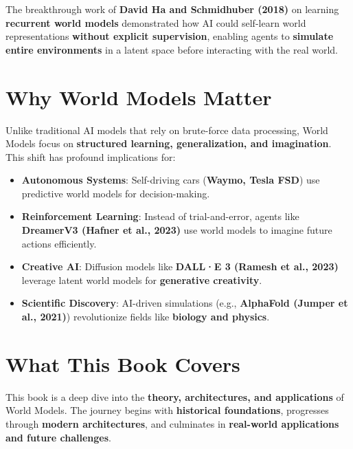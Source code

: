\documentclass[
]{book}
\providecommand{\tightlist}{%
  \setlength{\itemsep}{0pt}\setlength{\parskip}{0pt}}
\begin{document}
The breakthrough work of \textbf{David Ha and Schmidhuber (2018)} on learning \textbf{recurrent world models} demonstrated how AI could self-learn world representations \textbf{without explicit supervision}, enabling agents to \textbf{simulate entire environments} in a latent space before interacting with the real world.

\section{Why World Models Matter}\label{why-world-models-matter}

Unlike traditional AI models that rely on brute-force data processing, World Models focus on \textbf{structured learning, generalization, and imagination}. This shift has profound implications for:

\begin{itemize}
\tightlist
\item
  \textbf{Autonomous Systems}: Self-driving cars (\textbf{Waymo, Tesla FSD}) use predictive world models for decision-making.\\
\item
  \textbf{Reinforcement Learning}: Instead of trial-and-error, agents like \textbf{DreamerV3 (Hafner et al., 2023)} use world models to imagine future actions efficiently.\\
\item
  \textbf{Creative AI}: Diffusion models like \textbf{DALL·E 3 (Ramesh et al., 2023)} leverage latent world models for \textbf{generative creativity}.\\
\item
  \textbf{Scientific Discovery}: AI-driven simulations (e.g., \textbf{AlphaFold (Jumper et al., 2021)}) revolutionize fields like \textbf{biology and physics}.
\end{itemize}

\section{What This Book Covers}\label{what-this-book-covers}

This book is a deep dive into the \textbf{theory, architectures, and applications} of World Models. The journey begins with \textbf{historical foundations}, progresses through \textbf{modern architectures}, and culminates in \textbf{real-world applications and future challenges}.
\end{document}
